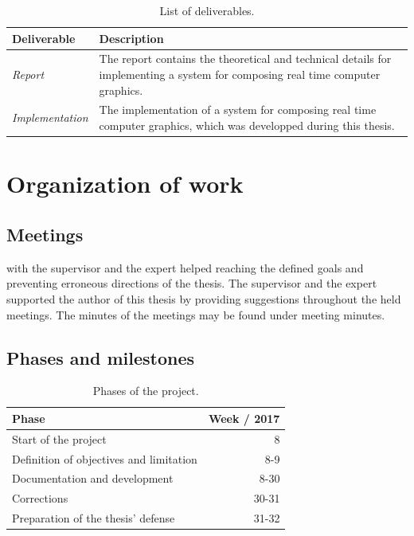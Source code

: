 \documentclass[%
    a4paper,    %
    justified,  %
    nobib,      %
    openany     %
]{tufte-book}
\begin{document}
\begin{table}[h]
  \caption{List of deliverables.}
  \begin{tabularx}{\textwidth}{lX}
    \toprule
    \textbf{Deliverable} & \textbf{Description} \\
    \midrule
    \textit{Report} & The report contains the theoretical and technical details for
    implementing a system for composing real time computer graphics. \\
    \midrule
    \textit{Implementation} & The implementation of a system for composing real time
    computer graphics, which was developped during this thesis. \\
    \bottomrule
  \end{tabularx}
\end{table}

\section{Organization of work}
\label{sec:organization-of-work}

\subsection{Meetings}
\label{subsec:meetings}

 with the supervisor and the expert helped reaching
the defined goals and preventing erroneous directions of the thesis. The
supervisor and the expert supported the author of this thesis by providing
suggestions throughout the held meetings. The minutes of the meetings may be
found under meeting minutes. 

\subsection{Phases and milestones}
\label{subsec:project-phases-milestones}

\begin{table}[h]
  \caption{Phases of the project.}
  \begin{tabularx}{\textwidth}{Xr}
    \toprule
    \textbf{Phase}   & \textbf{Week / 2017} \\
    \midrule
    Start of the project & 8 \\
    Definition of objectives and limitation & 8-9 \\
    Documentation and development & 8-30 \\
    Corrections & 30-31 \\
    Preparation of the thesis' defense & 31-32 \\
    \bottomrule
  \end{tabularx}
\end{table}
\end{document}
